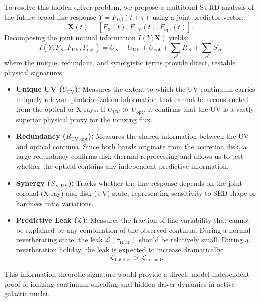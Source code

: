 \documentclass[fleqn,usenatbib]{mnras}
\begin{document}
To resolve this hidden-driver problem, we propose a multiband SURD analysis of the future broad-line response $Y = F_{\mathrm{H}\beta}(t+\tau)$ using a joint predictor vector:
\begin{equation}
\mathbf{X}(t) = \left[ F_{\mathrm{X}}(t), F_{\mathrm{UV}}(t), F_{\mathrm{opt}}(t) \right].
\label{eq:multiband_predictors}
\end{equation}
Decomposing the joint mutual information $I(Y; \mathbf{X})$ yields:
\begin{equation}
I(Y; F_{\mathrm{X}}, F_{\mathrm{UV}}, F_{\mathrm{opt}}) = U_{\mathrm{X}} + U_{\mathrm{UV}} + U_{\mathrm{opt}} + \sum_{\mathcal{A}} R_{\mathcal{A}} + \sum_{\mathcal{A}} S_{\mathcal{A}}
\label{eq:multiband_surd}
\end{equation}
where the unique, redundant, and synergistic terms provide direct, testable physical signatures:
\begin{itemize}
    \item \textbf{Unique UV ($U_{\mathrm{UV}}$):} Measures the extent to which the UV continuum carries uniquely relevant photoionization information that cannot be reconstructed from the optical or X-rays. If $U_{\mathrm{UV}} \gg U_{\mathrm{opt}}$, it confirms that the UV is a vastly superior physical proxy for the ionizing flux.
    \item \textbf{Redundancy ($R_{\mathrm{UV,opt}}$):} Measures the shared information between the UV and optical continua. Since both bands originate from the accretion disk, a large redundancy confirms disk thermal reprocessing and allows us to test whether the optical contains any independent predictive information.
    \item \textbf{Synergy ($S_{\mathrm{X,UV}}$):} Tracks whether the line response depends on the joint coronal (X-ray) and disk (UV) state, representing sensitivity to SED shape or hardness ratio variations.
    \item \textbf{Predictive Leak ($\mathcal{L}$):} Measures the fraction of line variability that cannot be explained by any combination of the observed continua. During a normal reverberating state, the leak $\mathcal{L}(\tau_{\mathrm{BLR}})$ should be relatively small. During a reverberation holiday, the leak is expected to increase dramatically:
    \begin{equation}
    \mathcal{L}_{\mathrm{holiday}} > \mathcal{L}_{\mathrm{normal}}.
    \label{eq:leak_holiday}
    \end{equation}
\end{itemize}
This information-theoretic signature would provide a direct, model-independent proof of ionizing-continuum shielding and hidden-driver dynamics in active galactic nuclei.
\end{document}
